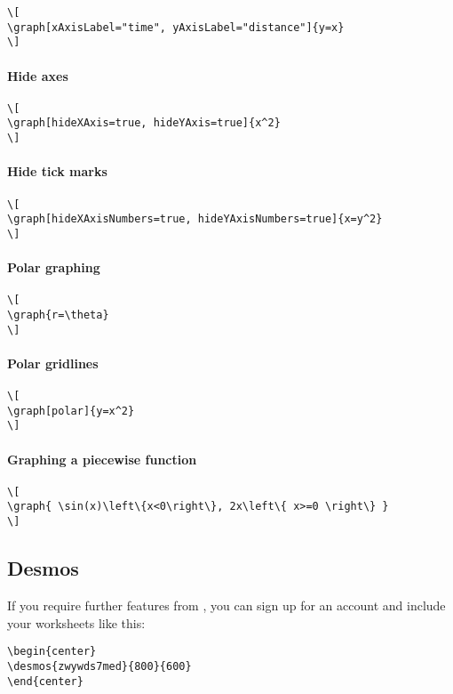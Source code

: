\documentclass{ximera}
\begin{document}
  
\begin{verbatim}
\[
\graph[xAxisLabel="time", yAxisLabel="distance"]{y=x}
\]
\end{verbatim}
\paragraph{Hide axes}

  
\begin{verbatim}
\[
\graph[hideXAxis=true, hideYAxis=true]{x^2}
\]
\end{verbatim}
\paragraph{Hide tick marks}

  
\begin{verbatim}
\[
\graph[hideXAxisNumbers=true, hideYAxisNumbers=true]{x=y^2}
\]
\end{verbatim}
\paragraph{Polar graphing}

  
\begin{verbatim}
\[
\graph{r=\theta}
\]
\end{verbatim}
\paragraph{Polar gridlines}


\begin{verbatim}
\[
\graph[polar]{y=x^2}
\]
\end{verbatim}
\paragraph{Graphing a piecewise function}


\begin{verbatim}
\[
\graph{ \sin(x)\left\{x<0\right\}, 2x\left\{ x>=0 \right\} }
\]
\end{verbatim}


\subsection{Desmos}

If you require further features from
, you can sign up for an account
and include your worksheets like this:

\begin{verbatim}
\begin{center}
\desmos{zwywds7med}{800}{600}
\end{center}
\end{verbatim}
\begin{center}
\end{center}
\end{document}
